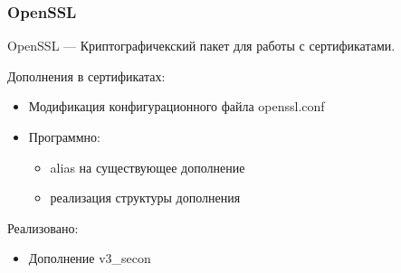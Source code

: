 \documentclass[xcolor={dvipsnames,table}]{beamer}
\begin{document}
\begin{frame}
 \frametitle{OpenSSL}
  

OpenSSL --- Криптографичекский пакет для работы с сертификатами.

\vspace{ 1em }

Дополнения в сертификатах:
\begin{itemize}
  \item Модификация конфигурационного файла openssl.conf
  \item Программно:
\begin{itemize}
  \item alias на существующее дополнение
  \item реализация структуры дополнения
\end{itemize}
\end{itemize}

\vspace{ 1em }

Реализовано:
\begin{itemize}
  \item Дополнение v3\_secon
\end{itemize}

  
\end{frame}
\end{document}
